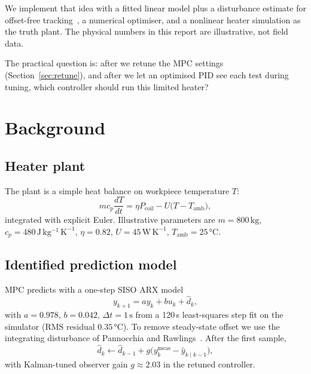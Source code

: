 \documentclass[11pt,a4paper]{article}
\newcommand{\unitC}{\si{\celsius}}
\begin{document}
We implement that idea with a fitted linear model plus a disturbance estimate for offset-free tracking~\cite{pannocchia2003}, a numerical optimiser, and a nonlinear heater simulation as the truth plant.
The physical numbers in this report are illustrative, not field data.

The practical question is: after we retune the MPC settings (Section~\ref{sec:retune}), and after we let an optimised PID see each test during tuning, which controller should run this limited heater?

\section{Background}
\subsection{Heater plant}
The plant is a simple heat balance on workpiece temperature \(T\):
\begin{equation}
  m c_p \frac{dT}{dt} = \eta P_{\mathrm{coil}} - U\bigl(T - T_{\mathrm{amb}}\bigr),
  \label{eq:heat}
\end{equation}
integrated with explicit Euler. Illustrative parameters are
\(m{=}800\,\mathrm{kg}\), \(c_p{=}480\,\mathrm{J\,kg^{-1}\,K^{-1}}\), \(\eta{=}0.82\),
\(U{=}45\,\mathrm{W\,K^{-1}}\), \(T_{\mathrm{amb}}{=}25\,\unitC\).

\subsection{Identified prediction model}
MPC predicts with a one-step SISO ARX model
\begin{equation}
  y_{k+1} = a y_k + b u_k + \hat{d}_k,
  \label{eq:arx}
\end{equation}
with \(a{=}0.978\), \(b{=}0.042\), \(\Delta t{=}1\,\mathrm{s}\) from a 120\,s least-squares step fit on the simulator (\(\mathrm{RMS}\) residual \(0.35\,\unitC\)).
To remove steady-state offset we use the integrating disturbance of Pannocchia and Rawlings~\cite{pannocchia2003}. After the first sample,
\begin{equation}
  \hat{d}_{k} \leftarrow \hat{d}_{k-1} + g\bigl(y_k^{\mathrm{meas}} - \hat{y}_{k\mid k-1}\bigr),
\end{equation}
with Kalman-tuned observer gain \(g{\approx}2.03\) in the retuned controller.
\end{document}

